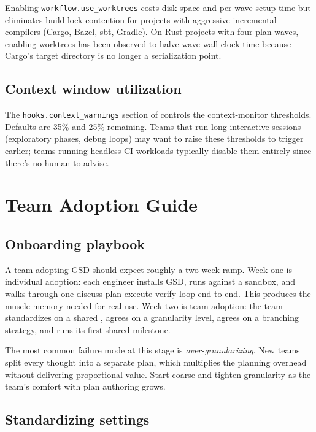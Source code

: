 \documentclass[11pt,letterpaper,openany]{book}
\begin{document}
Enabling \texttt{workflow.use\_worktrees} costs disk space and per-wave setup time but eliminates build-lock contention for projects with aggressive incremental compilers (Cargo, Bazel, sbt, Gradle). On Rust projects with four-plan waves, enabling worktrees has been observed to halve wave wall-clock time because Cargo's target directory is no longer a serialization point.

\section{Context window utilization}

The \texttt{hooks.context\_warnings} section of  controls the context-monitor thresholds. Defaults are 35\% and 25\% remaining. Teams that run long interactive sessions (exploratory phases, debug loops) may want to raise these thresholds to trigger earlier; teams running headless CI workloads typically disable them entirely since there's no human to advise.

\chapter{Team Adoption Guide}

\section{Onboarding playbook}

A team adopting GSD should expect roughly a two-week ramp. Week one is individual adoption: each engineer installs GSD, runs  against a sandbox, and walks through one discuss-plan-execute-verify loop end-to-end. This produces the muscle memory needed for real use. Week two is team adoption: the team standardizes on a shared , agrees on a granularity level, agrees on a branching strategy, and runs its first shared milestone.

The most common failure mode at this stage is \textit{over-granularizing}. New teams split every thought into a separate plan, which multiplies the planning overhead without delivering proportional value. Start coarse and tighten granularity as the team's comfort with plan authoring grows.

\section{Standardizing settings}
\end{document}
